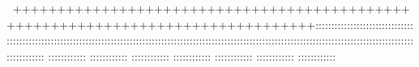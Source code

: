 ++++++++++++++++++++++++++++++++++++++++++++++++++++++++++++++++++++++++++++++++::::::::::::::::::::::::::::::::::::::::::::::::::::::::::::::::::::::::::::::::::::::::::::::::::::::::::::::::::::::::::::::::::::::::::::::::::::::::::::::::    ::::::::::::        ::::::::::::        ::::::::::::        ::::::::::::        ::::::::::::        ::::::::::::        ::::::::::::        ::::::::::::     